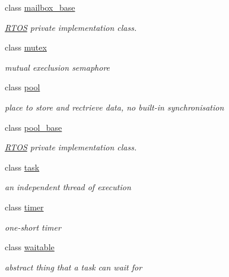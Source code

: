 \begin{DoxyCompactItemize}
class \hyperlink{class_r_t_o_s_1_1mailbox__base}{mailbox\+\_\+base}
\begin{DoxyCompactList}\small\item\em \hyperlink{class_r_t_o_s}{R\+T\+OS} private implementation class. \end{DoxyCompactList}\item 
class \hyperlink{class_r_t_o_s_1_1mutex}{mutex}
\begin{DoxyCompactList}\small\item\em mutual execlusion semaphore \end{DoxyCompactList}\item 
class \hyperlink{class_r_t_o_s_1_1pool}{pool}
\begin{DoxyCompactList}\small\item\em place to store and rectrieve data, no built-\/in synchronisation \end{DoxyCompactList}\item 
class \hyperlink{class_r_t_o_s_1_1pool__base}{pool\+\_\+base}
\begin{DoxyCompactList}\small\item\em \hyperlink{class_r_t_o_s}{R\+T\+OS} private implementation class. \end{DoxyCompactList}\item 
class \hyperlink{class_r_t_o_s_1_1task}{task}
\begin{DoxyCompactList}\small\item\em an independent thread of execution \end{DoxyCompactList}\item 
class \hyperlink{class_r_t_o_s_1_1timer}{timer}
\begin{DoxyCompactList}\small\item\em one-\/short timer \end{DoxyCompactList}\item 
class \hyperlink{class_r_t_o_s_1_1waitable}{waitable}
\begin{DoxyCompactList}\small\item\em abstract thing that a task can wait for \end{DoxyCompactList}\end{DoxyCompactItemize}
